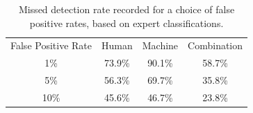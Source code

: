\documentclass[a4paper,fleqn,usenatbib]{mnras}
\begin{document}
\begin{table}
\begin{tabular}{|c|c|c|c|}
False Positive Rate & Human & Machine & Combination\\
1\% & 73.9\% & 90.1\% & 58.7\%\\
5\% & 56.3\% & 69.7\% & 35.8\%\\
10\% & 45.6\% & 46.7\% & 23.8\%\\
\end{tabular}
\caption{Missed detection rate recorded for a choice of false positive rates, based on expert classifications.}
\label{tab:roc_fpr}
\end{table}


\end{document}
